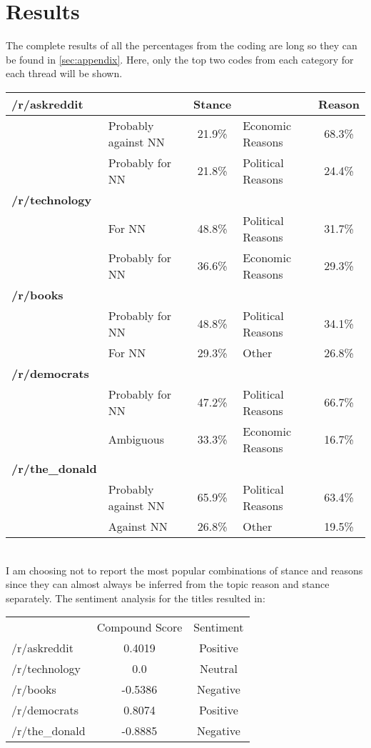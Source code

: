 \documentclass[11pt]{article}
\begin{document}
	\section{Results}\label{sec:results}
	The complete results of all the percentages from the coding are long so they can be found in \cref{sec:appendix}. Here, only the top two codes from each category for each thread will be shown. 
	\\[2\baselineskip]
	\begin{tabular}{l|lc|lc}
		\multicolumn{1}{l}{\textbf{/r/askreddit}} & & \multicolumn{1}{c}{Stance} & & \multicolumn{1}{c}{Reason}\\\hline
		& Probably against NN & 21.9\% & Economic Reasons & 68.3\% \\
		& Probably for NN & 21.8\% & Political Reasons & 24.4\% \\
		\textbf{/r/technology}&&&&\\\hline
		& For NN & 48.8\% & Political Reasons & 31.7\% \\
		& Probably for NN & 36.6\% & Economic Reasons & 29.3\% \\
		\textbf{/r/books}&&&&\\\hline
		& Probably for NN & 48.8\% & Political Reasons & 34.1\% \\
		& For NN & 29.3\% & Other & 26.8\% \\
		\textbf{/r/democrats} &&&&\\\hline
		& Probably for NN & 47.2\% & Political Reasons & 66.7\% \\
		& Ambiguous & 33.3\% & Economic Reasons & 16.7\% \\
		\textbf{/r/the\_donald}&&&&\\\hline
		& Probably against NN & 65.9\% & Political Reasons & 63.4\% \\
		& Against NN & 26.8\% & Other & 19.5\% \\
	\end{tabular}
	\\[2\baselineskip]
	I am choosing not to report the most popular combinations of stance and reasons since they can almost always be inferred from the topic reason and stance separately. The sentiment analysis for the titles resulted in:
	\\[2\baselineskip]
	\begin{tabular}{l|cc}
		& Compound Score & Sentiment \\
		/r/askreddit & 0.4019 & Positive \\
		/r/technology & 0.0 & Neutral \\
		/r/books & -0.5386 & Negative \\
		/r/democrats & 0.8074 & Positive \\
		/r/the\_donald & -0.8885 & Negative
	\end{tabular}
\end{document}
